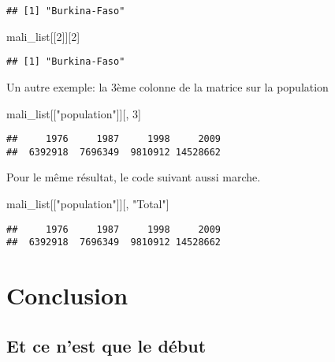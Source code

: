 \documentclass[]{book}
\newenvironment{Shaded}{\begin{snugshade}}{\end{snugshade}}
\newcommand{\DecValTok}[1]{\textcolor[rgb]{0.00,0.00,0.81}{#1}}
\newcommand{\StringTok}[1]{\textcolor[rgb]{0.31,0.60,0.02}{#1}}
\newcommand{\NormalTok}[1]{#1}
\begin{document}
\begin{verbatim}
## [1] "Burkina-Faso"
\end{verbatim}

\begin{Shaded}
\begin{Highlighting}[]
\NormalTok{mali_list[[}\DecValTok{2}\NormalTok{]][}\DecValTok{2}\NormalTok{]}
\end{Highlighting}
\end{Shaded}

\begin{verbatim}
## [1] "Burkina-Faso"
\end{verbatim}

Un autre exemple: la 3ème colonne de la matrice sur la population

\begin{Shaded}
\begin{Highlighting}[]
\NormalTok{mali_list[[}\StringTok{"population"}\NormalTok{]][, }\DecValTok{3}\NormalTok{]}
\end{Highlighting}
\end{Shaded}

\begin{verbatim}
##     1976     1987     1998     2009 
##  6392918  7696349  9810912 14528662
\end{verbatim}

Pour le même résultat, le code suivant aussi marche.

\begin{Shaded}
\begin{Highlighting}[]
\NormalTok{mali_list[[}\StringTok{"population"}\NormalTok{]][, }\StringTok{"Total"}\NormalTok{]}
\end{Highlighting}
\end{Shaded}

\begin{verbatim}
##     1976     1987     1998     2009 
##  6392918  7696349  9810912 14528662
\end{verbatim}

\section{Conclusion}\label{conclusion}

\subsection{Et ce n'est que le début}\label{et-ce-nest-que-le-debut}
\end{document}

